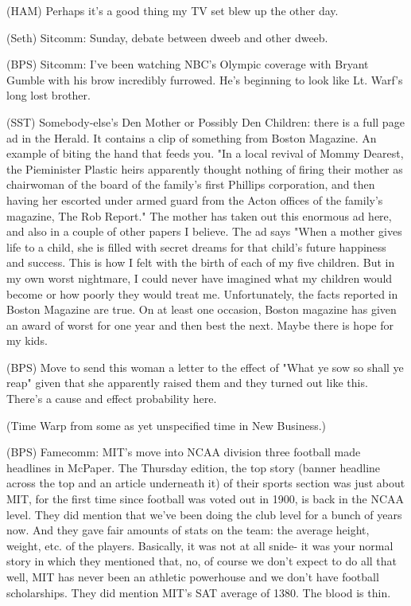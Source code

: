 \documentclass[12pt]{article}
\begin{document}
(HAM) Perhaps it's a good thing my TV set blew up the other day.

(Seth) Sitcomm: Sunday, debate between dweeb and other dweeb.

(BPS) Sitcomm: I've been watching NBC's Olympic coverage with Bryant Gumble with his brow incredibly furrowed. He's beginning to look like Lt. Warf's long lost brother.

(SST) Somebody-else's Den Mother or Possibly Den Children: there is a full page ad in the
Herald. It contains a clip of something from Boston Magazine. An example of biting the hand that feeds you. "In a local revival of Mommy Dearest, the Pieminister Plastic heirs apparently thought nothing of firing their mother as chairwoman of the board of the family's first Phillips corporation, and then having her escorted under armed guard from the Acton offices of the family's magazine, The Rob Report." The mother has taken out this enormous ad here, and also in a couple of other papers I believe. The ad says "When a mother gives life to a child, she is filled with secret dreams for that child's future happiness and success. This is how I felt with the birth of each of my five children. But in my own worst nightmare, I could never have imagined what my children would become or how poorly they would treat me. Unfortunately, the facts reported in Boston Magazine are true. On at least one occasion, Boston magazine has given an award of worst for one year and then best the next. Maybe there is hope for my kids.

(BPS) Move to send this woman a letter to the effect of "What ye sow so shall ye reap" given that she apparently raised them and they turned out like this. There's a cause and effect probability here.

(Time Warp from some as yet unspecified time in New Business.)

(BPS) Famecomm: MIT's move into NCAA division three football made headlines in McPaper. The Thursday edition, the top story (banner headline across the top and an article underneath it) of their sports section was just about MIT, for the first time since football was voted out in 1900, is back in the NCAA level. They did mention that we've been doing the club level for a bunch of years now. And they gave fair amounts of stats on the team: the average height, weight, etc. of the players. Basically, it was not at all snide- it was your normal story in which they mentioned that, no, of course we don't expect to do all that well, MIT has never been an athletic powerhouse and we don't have football scholarships. They did mention MIT's SAT average of 1380. The blood is thin.
\end{document}
